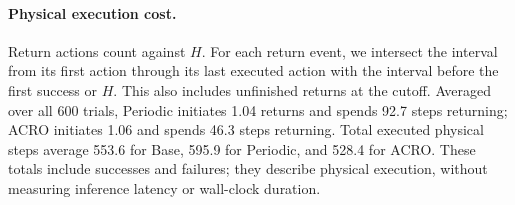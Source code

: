 \paragraph{Physical execution cost.}
Return actions count against $H$. For each return event, we intersect the interval from its first action through its last executed action with the interval before the first success or $H$. This also includes unfinished returns at the cutoff. Averaged over all 600 trials, Periodic initiates 1.04 returns and spends 92.7 steps returning; ACRO initiates 1.06 and spends 46.3 steps returning. Total executed physical steps average 553.6 for Base, 595.9 for Periodic, and 528.4 for ACRO. These totals include successes and failures; they describe physical execution, without measuring inference latency or wall-clock duration.

\FloatBarrier
